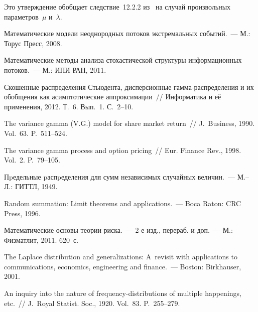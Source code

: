 \begin{multicols}{2}
\smallskip

Это утверждение обобщает следствие~12.2.2 из~\cite{KorolevBeningShorgin2011} 
на случай произвольных параметров~$\mu$ и~$\lambda$.

{\small\frenchspacing
{%
\begin{thebibliography}{99}

 Математические модели
неоднородных потоков экстремальных событий.~--- М.: Торус Пресс, 2008.

 Математические
методы анализа стохастической структуры информационных потоков.~---
М.: ИПИ РАН, 2011.

 Скошенные распределения Стьюдента,
дисперсионные гам\-ма-рас\-пре\-де\-ле\-ния и их обобщения как асимптотические
аппроксимации~// Информатика и её применения, 2012. Т.~6. Вып.~1.
С.~2--10.

 The variance gamma (V.G.) model for
share market return~// J.~Business, 1990. Vol.~63.
P.~511--524.

 The variance gamma process and option pricing~//
Eur. Finance Rev., 1998. Vol.~2. P.~79--105.

 Пpедельные
pаспpеделения для сумм независимых случайных величин.~--- М.--Л.:
ГИТТЛ, 1949.

 Random summation:
Limit theorems and applications.~--- Boca Raton: CRC Press, 1996.

 Математические
основы теории риска.~--- 2-е изд., перераб. и доп.~--- М.: Физматлит,
2011. 620~с.

 The Laplace distribution and generalizations: A~revisit with applications to 
communications, economics, engineering and finance.~--- Boston: Birkhauser, 2001.

 An
inquiry into the nature of frequency-distributions of multiple
happenings, etc.~// J.~Royal Statist. Soc., 1920. Vol.~83. P.~255--279.


\end{thebibliography}}}
\end{multicols}

